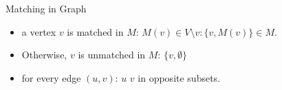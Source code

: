 \documentclass{beamer}
\begin{document}




\begin{frame}{Matching in Graph}
	\begin{description}[leftmargin=!,labelwidth=\widthof{\bfseries strict preference order}]
		\item [\emph{Unweighted Graphs in Matching}]
	\end{description}
				\begin{itemize}
					\item  a vertex $v$ is matched in $M$: $M(v) \in V \setminus{v} : \{v, M(v)\} \in M$. 
					\item  Otherwise, $v$ is unmatched in $M$: $\{v, \emptyset\}$
				\end{itemize}
	\begin{description}[leftmargin=!,labelwidth=\widthof{\bfseries strict preference order}]
		\item [\emph{Bipartite Graph}] 
	\end{description}
	\begin{itemize}
		\item for every edge $(u,v)$:  $u$ $v$ in opposite subsets.
	\end{itemize}
\end{frame}
\end{document}
